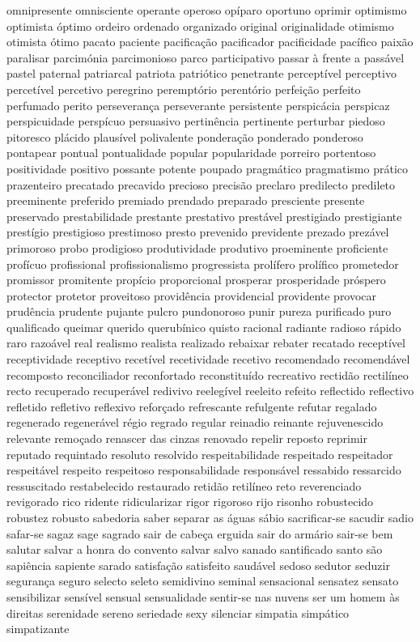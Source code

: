 omnipresente omnisciente operante operoso op\'{i}paro oportuno oprimir optimismo optimista \'{o}ptimo ordeiro ordenado organizado original originalidade otimismo otimista \'{o}timo pacato paciente pacifica\c{c}\~ao pacificador pacificidade pac\'{i}fico paix\~ao paralisar parcim\'{o}nia parcimonioso parco participativo passar \`{a} frente a pass\'{a}vel pastel paternal patriarcal patriota patri\'{o}tico penetrante percept\'{i}vel perceptivo percet\'{i}vel percetivo peregrino perempt\'{o}rio perent\'{o}rio perfei\c{c}\~ao perfeito perfumado perito perseveran\c{c}a perseverante persistente perspic\'{a}cia perspicaz perspicuidade persp\'{i}cuo persuasivo pertin\^{e}ncia pertinente perturbar piedoso pitoresco pl\'{a}cido plaus\'{i}vel polivalente pondera\c{c}\~ao ponderado ponderoso pontapear pontual pontualidade popular popularidade porreiro portentoso positividade positivo possante potente poupado pragm\'{a}tico pragmatismo pr\'{a}tico prazenteiro precatado precavido precioso precis\~ao preclaro predilecto predileto preeminente preferido premiado prendado preparado presciente presente preservado prestabilidade prestante prestativo prest\'{a}vel prestigiado prestigiante prest\'{i}gio prestigioso prestimoso presto prevenido previdente prezado prez\'{a}vel primoroso probo prodigioso produtividade produtivo proeminente proficiente prof\'{i}cuo profissional profissionalismo progressista prol\'{i}fero prol\'{i}fico prometedor promissor promitente prop\'{i}cio proporcional prosperar prosperidade pr\'{o}spero protector protetor proveitoso provid\^{e}ncia providencial providente provocar prud\^{e}ncia prudente pujante pulcro pundonoroso punir pureza purificado puro qualificado queimar querido querub\'{i}nico quisto racional radiante radioso r\'{a}pido raro razo\'{a}vel real realismo realista realizado rebaixar rebater recatado recept\'{i}vel receptividade receptivo recet\'{i}vel recetividade recetivo recomendado recomend\'{a}vel recomposto reconciliador reconfortado reconstitu\'{i}do recreativo rectid\~ao rectil\'{i}neo recto recuperado recuper\'{a}vel redivivo reeleg\'{i}vel reeleito refeito reflectido reflectivo refletido refletivo reflexivo refor\c{c}ado refrescante refulgente refutar regalado regenerado regener\'{a}vel r\'{e}gio regrado regular reinadio reinante rejuvenescido relevante remo\c{c}ado renascer das cinzas renovado repelir reposto reprimir reputado requintado resoluto resolvido respeitabilidade respeitado respeitador respeit\'{a}vel respeito respeitoso responsabilidade respons\'{a}vel ressabido ressarcido ressuscitado restabelecido restaurado retid\~ao retil\'{i}neo reto reverenciado revigorado rico ridente ridicularizar rigor rigoroso rijo risonho robustecido robustez robusto sabedoria saber separar as \'{a}guas s\'{a}bio sacrificar-se sacudir sadio safar-se sagaz sage sagrado sair de cabe\c{c}a erguida sair do arm\'{a}rio sair-se bem salutar salvar a honra do convento salvar salvo sanado santificado santo s\~ao sapi\^{e}ncia sapiente sarado satisfa\c{c}\~ao satisfeito saud\'{a}vel sedoso sedutor seduzir seguran\c{c}a seguro selecto seleto semidivino seminal sensacional sensatez sensato sensibilizar sens\'{i}vel sensual sensualidade sentir-se nas nuvens ser um homem \`{a}s direitas serenidade sereno seriedade sexy silenciar simpatia simp\'{a}tico simpatizante 